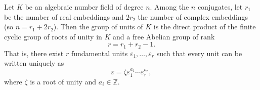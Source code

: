Let $K$ be an algebraic number field of degree $n$. Among the $n$ conjugates, let $r_1$ be the number of real embeddings and $2r_2$ the number of complex embeddings (so $n = r_1 + 2r_2$). Then the group of units of $K$ is the direct product of the finite cyclic group of roots of unity in $K$ and a free Abelian group of rank
$$r = r_1 + r_2 - 1.$$
That is, there exist $r$ fundamental units $\varepsilon_1, \ldots, \varepsilon_r$ such that every unit can be written uniquely as
$$\varepsilon = \zeta \varepsilon_1^{a_1} \cdots \varepsilon_r^{a_r},$$
where $\zeta$ is a root of unity and $a_i \in \mathbb{Z}$.
